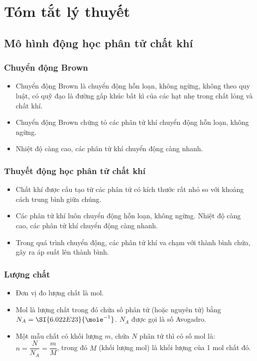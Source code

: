 \chapter{Tóm tắt lý thuyết}
\section{Mô hình động học phân tử chất khí}
\subsection{Chuyển động Brown}
\begin{itemize}
	\item Chuyển động Brown là chuyển động hỗn loạn, không ngừng, không theo quy luật, có quỹ đạo là đường gấp khúc bất kì của các hạt nhẹ trong chất lỏng và chất khí.
	\item Chuyển động Brown chứng tỏ các phân tử khí chuyển động hỗn loạn, không ngừng.
	\item Nhiệt độ càng cao, các phân tử khí chuyển động càng nhanh.
\end{itemize}
\subsection{Thuyết động học phân tử chất khí}
\begin{itemize}
	\item Chất khí được cấu tạo từ các phân tử có kích thước rất nhỏ so với khoảng cách trung bình giữa chúng.
	\item Các phân tử khí luôn chuyển động hỗn loạn, không ngừng. Nhiệt độ càng cao, các phân tử khí chuyển động càng nhanh.
	\item Trong quá trình chuyển động, các phân tử khí va chạm với thành bình chứa, gây ra áp suất lên thành bình.
\end{itemize}
\subsection{Lượng chất}
\begin{itemize}
	\item Đơn vị đo lượng chất là $\si{\mole}$.
	\item Mol là lượng chất trong đó chứa số phân tử (hoặc nguyên tử) bằng $N_A = \SI{6.022E23}{\mole^{-1}}$.	$N_A$ được gọi là số Avogadro.
	\item Một mẫu chất có khối lượng $m$, chứa $N$ phân tử thì có số mol là: $n=\dfrac{N}{N_A}=\dfrac{m}{M}$, trong đó
	$M$ (khối lượng mol) là khối lượng của 1 mol chất đó.
\end{itemize}
